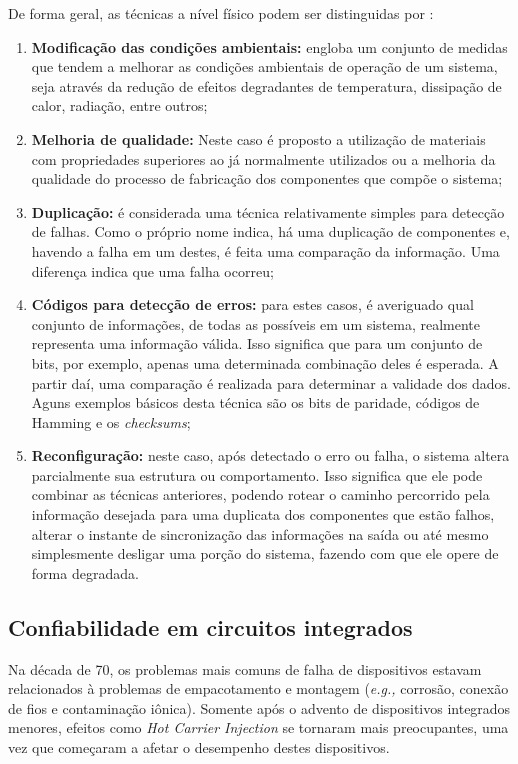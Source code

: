 De forma geral, as técnicas a nível físico podem ser distinguidas por \cite{Siewiorek1992}:
\begin{enumerate} 
\item \textbf{Modificação das condições ambientais:} engloba um conjunto de medidas que tendem a melhorar as condições ambientais de operação de um sistema, seja através da redução de efeitos degradantes de temperatura, dissipação de calor, radiação, entre outros;
\item \textbf{Melhoria de qualidade:} Neste caso é proposto a utilização de materiais com propriedades superiores ao já normalmente utilizados ou a melhoria da qualidade do processo de fabricação dos componentes que compõe o sistema;
\item \textbf{Duplicação:} é considerada uma técnica relativamente simples para detecção de falhas. Como o próprio nome indica, há uma duplicação de componentes e, havendo a falha em um destes, é feita uma comparação da informação. Uma diferença indica que uma falha ocorreu;
\item \textbf{Códigos para detecção de erros:} para estes casos, é averiguado qual conjunto de informações, de todas as possíveis em um sistema, realmente representa uma informação válida. Isso significa que para um conjunto de bits, por exemplo, apenas uma determinada combinação deles é esperada. A partir daí, uma comparação é realizada para determinar a validade dos dados. Aguns exemplos básicos desta técnica são os bits de paridade, códigos de Hamming e os \textit{checksums};
\item \textbf{Reconfiguração:} neste caso, após detectado o erro ou falha, o sistema altera parcialmente sua estrutura ou comportamento. Isso significa que ele pode combinar as técnicas anteriores, podendo rotear o caminho percorrido pela informação desejada para uma duplicata dos componentes que estão falhos, alterar o instante de sincronização das informações na saída ou até mesmo simplesmente desligar uma porção do sistema, fazendo com que ele opere de forma degradada.
\end{enumerate}


\subsection{Confiabilidade em circuitos integrados}
\label{subsection_Conf_CI}
Na década de 70, os problemas mais comuns de falha de dispositivos estavam relacionados à problemas de empacotamento e montagem (\textit{e.g.,} corros\~{a}o, conexão de fios e contaminação iônica). Somente após o advento de dispositivos integrados menores, efeitos como \textit{Hot Carrier Injection} se tornaram mais preocupantes, uma vez que começaram a afetar o desempenho destes dispositivos.


